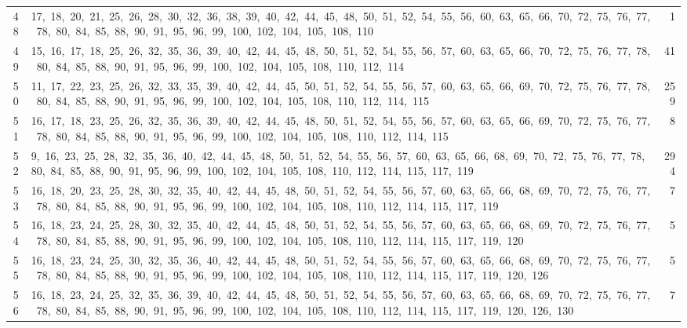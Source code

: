\begin{longtable}{c|p{}|r}
48 & 17,\ 18,\ 20,\ 21,\ 25,\ 26,\ 28,\ 30,\ 32,\ 36,\ 38,\ 39,\ 40,\ 42,\ 44,\ 45,\ 48,\ 50,\ 51,\ 52,\ 54,\ 55,\ 56,\ 60,\ 63,\ 65,\ 66,\ 70,\ 72,\ 75,\ 76,\ 77,\ 78,\ 80,\ 84,\ 85,\ 88,\ 90,\ 91,\ 95,\ 96,\ 99,\ 100,\ 102,\ 104,\ 105,\ 108,\ 110 & 1 \\
49 & 15,\ 16,\ 17,\ 18,\ 25,\ 26,\ 32,\ 35,\ 36,\ 39,\ 40,\ 42,\ 44,\ 45,\ 48,\ 50,\ 51,\ 52,\ 54,\ 55,\ 56,\ 57,\ 60,\ 63,\ 65,\ 66,\ 70,\ 72,\ 75,\ 76,\ 77,\ 78,\ 80,\ 84,\ 85,\ 88,\ 90,\ 91,\ 95,\ 96,\ 99,\ 100,\ 102,\ 104,\ 105,\ 108,\ 110,\ 112,\ 114 & 41 \\
50 & 11,\ 17,\ 22,\ 23,\ 25,\ 26,\ 32,\ 33,\ 35,\ 39,\ 40,\ 42,\ 44,\ 45,\ 50,\ 51,\ 52,\ 54,\ 55,\ 56,\ 57,\ 60,\ 63,\ 65,\ 66,\ 69,\ 70,\ 72,\ 75,\ 76,\ 77,\ 78,\ 80,\ 84,\ 85,\ 88,\ 90,\ 91,\ 95,\ 96,\ 99,\ 100,\ 102,\ 104,\ 105,\ 108,\ 110,\ 112,\ 114,\ 115 & 259 \\
51 & 16,\ 17,\ 18,\ 23,\ 25,\ 26,\ 32,\ 35,\ 36,\ 39,\ 40,\ 42,\ 44,\ 45,\ 48,\ 50,\ 51,\ 52,\ 54,\ 55,\ 56,\ 57,\ 60,\ 63,\ 65,\ 66,\ 69,\ 70,\ 72,\ 75,\ 76,\ 77,\ 78,\ 80,\ 84,\ 85,\ 88,\ 90,\ 91,\ 95,\ 96,\ 99,\ 100,\ 102,\ 104,\ 105,\ 108,\ 110,\ 112,\ 114,\ 115 & 8 \\
52 & 9,\ 16,\ 23,\ 25,\ 28,\ 32,\ 35,\ 36,\ 40,\ 42,\ 44,\ 45,\ 48,\ 50,\ 51,\ 52,\ 54,\ 55,\ 56,\ 57,\ 60,\ 63,\ 65,\ 66,\ 68,\ 69,\ 70,\ 72,\ 75,\ 76,\ 77,\ 78,\ 80,\ 84,\ 85,\ 88,\ 90,\ 91,\ 95,\ 96,\ 99,\ 100,\ 102,\ 104,\ 105,\ 108,\ 110,\ 112,\ 114,\ 115,\ 117,\ 119 & 294 \\
53 & 16,\ 18,\ 20,\ 23,\ 25,\ 28,\ 30,\ 32,\ 35,\ 40,\ 42,\ 44,\ 45,\ 48,\ 50,\ 51,\ 52,\ 54,\ 55,\ 56,\ 57,\ 60,\ 63,\ 65,\ 66,\ 68,\ 69,\ 70,\ 72,\ 75,\ 76,\ 77,\ 78,\ 80,\ 84,\ 85,\ 88,\ 90,\ 91,\ 95,\ 96,\ 99,\ 100,\ 102,\ 104,\ 105,\ 108,\ 110,\ 112,\ 114,\ 115,\ 117,\ 119 & 7 \\
54 & 16,\ 18,\ 23,\ 24,\ 25,\ 28,\ 30,\ 32,\ 35,\ 40,\ 42,\ 44,\ 45,\ 48,\ 50,\ 51,\ 52,\ 54,\ 55,\ 56,\ 57,\ 60,\ 63,\ 65,\ 66,\ 68,\ 69,\ 70,\ 72,\ 75,\ 76,\ 77,\ 78,\ 80,\ 84,\ 85,\ 88,\ 90,\ 91,\ 95,\ 96,\ 99,\ 100,\ 102,\ 104,\ 105,\ 108,\ 110,\ 112,\ 114,\ 115,\ 117,\ 119,\ 120 & 5 \\
55 & 16,\ 18,\ 23,\ 24,\ 25,\ 30,\ 32,\ 35,\ 36,\ 40,\ 42,\ 44,\ 45,\ 48,\ 50,\ 51,\ 52,\ 54,\ 55,\ 56,\ 57,\ 60,\ 63,\ 65,\ 66,\ 68,\ 69,\ 70,\ 72,\ 75,\ 76,\ 77,\ 78,\ 80,\ 84,\ 85,\ 88,\ 90,\ 91,\ 95,\ 96,\ 99,\ 100,\ 102,\ 104,\ 105,\ 108,\ 110,\ 112,\ 114,\ 115,\ 117,\ 119,\ 120,\ 126 & 5 \\
56 & 16,\ 18,\ 23,\ 24,\ 25,\ 32,\ 35,\ 36,\ 39,\ 40,\ 42,\ 44,\ 45,\ 48,\ 50,\ 51,\ 52,\ 54,\ 55,\ 56,\ 57,\ 60,\ 63,\ 65,\ 66,\ 68,\ 69,\ 70,\ 72,\ 75,\ 76,\ 77,\ 78,\ 80,\ 84,\ 85,\ 88,\ 90,\ 91,\ 95,\ 96,\ 99,\ 100,\ 102,\ 104,\ 105,\ 108,\ 110,\ 112,\ 114,\ 115,\ 117,\ 119,\ 120,\ 126,\ 130 & 7 \\

\end{longtable}
